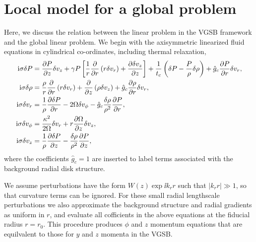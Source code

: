 \section{Local model for a global problem}
Here, we discuss the relation between the linear problem in the
VGSB framework and the global linear problem. We begin with the
axisymmetric linearized fluid equations in cylindrical co-ordinates, including
thermal relaxation, 
\begin{align}
\mathrm{i}\sigma\delta P &=\frac{\partial P}{\partial z}\delta v_z + \gamma P
\left[\frac{1}{r}\frac{\partial}{\partial r}\left(r\delta v_r\right) + \frac{\partial
    \delta v_z}{\partial z}\right] + \frac{1}{t_c}\left(\delta P -
  \frac{P}{\rho}\delta\rho\right) + \hat{g}_c \frac{\partial P}{\partial r}\delta v_r,\\
  \mathrm{i}\sigma\delta\rho &= \frac{\rho}{r}\frac{\partial}{\partial r}\left(r\delta v_r\right) + \frac{\partial}{\partial
  z}\left(\rho\delta v_z\right)  + \hat{g}_c\frac{\partial\rho}{\partial r}\delta v_r,\\
\mathrm{i}\sigma\delta v_r &= \frac{1}{\rho}\frac{\partial\delta P}{\partial r} - 2\Omega
\delta v_\phi - \hat{g}_c\frac{\delta\rho}{\rho^2}\frac{\partial P}{\partial r},\\ 
\mathrm{i}\sigma\delta v_\phi  &= \frac{\kappa^2}{2\Omega}\delta v_r +
r\frac{\partial\Omega}{\partial z}\delta v_z,\\
\mathrm{i} \sigma\delta v_z &= \frac{1}{\rho}\frac{\partial\delta P}{\partial z} -
\frac{\delta \rho}{\rho^2}\frac{\partial P}{\partial z},
\end{align}
where the coefficients $\hat{g}_c=1$ are inserted to label terms
associated with the background radial disk structure. 

We assume perturbations have the form $W(z)\exp{\ii k_r r}$ such
that $|k_rr|\gg1$, so that curvature terms can be ignored. For these
small radial lengthscale perturbations we also approximate the
background structure and radial gradients as uniform in $r$, and
evaluate all cofficients in the above equations at the fiducial radius
$r=r_0$. This procedure produces $\phi$ and $z$ momentum equations
that are equilvalent to those for $y$ and $z$ momenta in the VGSB. 

